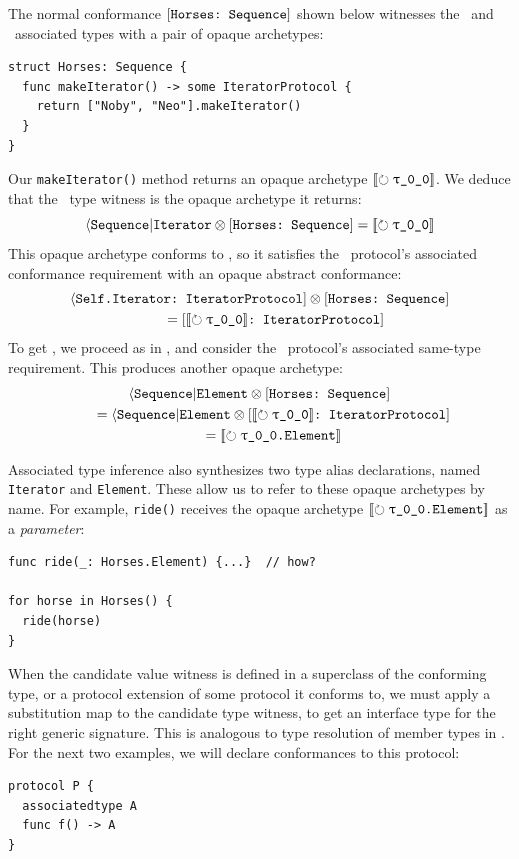 \documentclass[../generics]{subfiles}
\begin{document}
\begin{example}\label{opaque archetype witness example}
The normal conformance $[\texttt{Horses:~Sequence}]$ shown below witnesses the \nElement\ and \nIterator\ associated types with a pair of opaque archetypes:
\begin{Verbatim}
struct Horses: Sequence {
  func makeIterator() -> some IteratorProtocol {
    return ["Noby", "Neo"].makeIterator()
  }
}
\end{Verbatim}
Our \texttt{makeIterator()} method returns an opaque archetype $\Ox$. We deduce that the \nIterator\ type witness is the opaque archetype it returns:
\[
\AIterator \otimes \ConfReq{Horses}{Sequence} = \Ox
\]
This opaque archetype conforms to \tIterator, so it satisfies the \tSequence\ protocol's associated conformance requirement with an opaque abstract conformance:
\begin{gather*}
\SelfIterator \otimes \ConfReq{Horses}{Sequence} \\
\qquad {} = \ConfReq{$\Ox$}{IteratorProtocol}
\end{gather*}
To get \nElement, we proceed as in , and consider the \tSequence\ protocol's associated same-type requirement. This produces another opaque archetype:
\begin{gather*}
\AElement \otimes \ConfReq{Horses}{Sequence} \\
\qquad = \AElement \otimes \ConfReq{$\Ox$}{IteratorProtocol} \\
\qquad = \Opaque{\rT.Element}
\end{gather*}

Associated type inference also synthesizes two type alias declarations, named \texttt{Iterator} and \texttt{Element}. These allow us to refer to these opaque archetypes by name. For example, \texttt{ride()} receives the opaque archetype $\Opaque{\rT.Element}$ as a \emph{parameter}:
\begin{Verbatim}
func ride(_: Horses.Element) {...}  // how?

for horse in Horses() {
  ride(horse)
}
\end{Verbatim}
\end{example}

When the candidate value witness is defined in a superclass of the conforming type, or a protocol extension of some protocol it conforms to, we must apply a substitution map to the candidate type witness, to get an interface type for the right generic signature. This is analogous to type resolution of member types in . For the next two examples, we will declare conformances to this protocol:
\begin{Verbatim}
protocol P {
  associatedtype A
  func f() -> A
}
\end{Verbatim}
\end{document}
